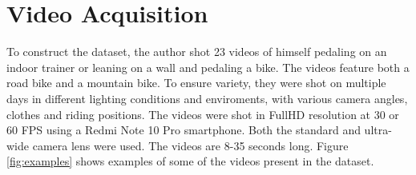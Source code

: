 \section{Video Acquisition}

To construct the dataset, the author shot 23 videos of himself pedaling on an indoor trainer or leaning on a wall and pedaling a bike. The videos feature both a road bike and a mountain bike. To ensure variety, they were shot on multiple days in different lighting conditions and enviroments, with various camera angles, clothes and riding positions. The videos were shot in FullHD resolution at 30 or 60 FPS using a Redmi Note 10 Pro smartphone. Both the standard and ultra-wide camera lens were used. The videos are 8-35 seconds long. Figure \ref{fig:examples} shows examples of some of the videos present in the dataset.

\def\imgwidth{0.325\textwidth}

